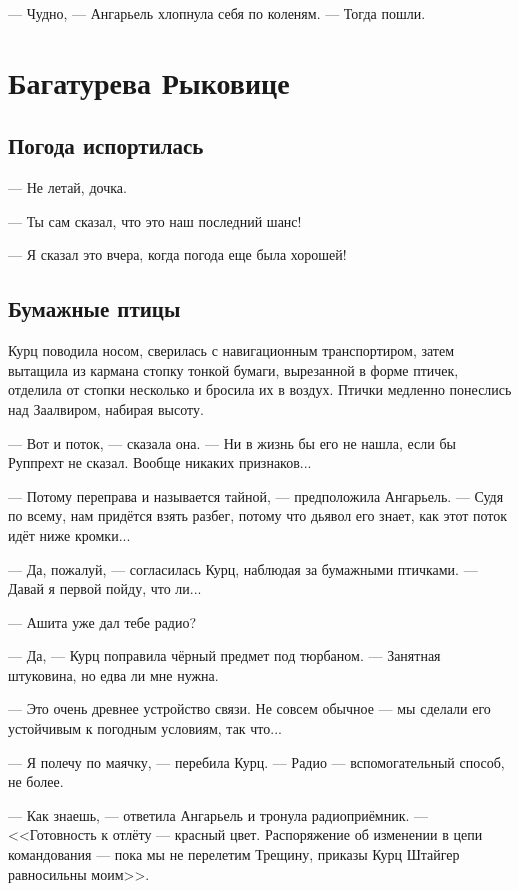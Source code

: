 --- Чудно, --- Ангарьель хлопнула себя по коленям.
--- Тогда пошли.

\chapter{Багатурева Рыковице}


\section{Погода испортилась}

--- Не летай, дочка.

--- Ты сам сказал, что это наш последний шанс!

--- Я сказал это вчера, когда погода еще была хорошей!

\section{Бумажные птицы}

Курц поводила носом, сверилась с навигационным транспортиром, затем вытащила из кармана стопку тонкой бумаги, вырезанной в форме птичек, отделила от стопки несколько и бросила их в воздух.
Птички медленно понеслись над Заалвиром, набирая высоту.

--- Вот и поток, --- сказала она.
--- Ни в жизнь бы его не нашла, если бы Руппрехт не сказал.
Вообще никаких признаков...

--- Потому переправа и называется тайной, --- предположила Ангарьель.
--- Судя по всему, нам придётся взять разбег, потому что дьявол его знает, как этот поток идёт ниже кромки...

--- Да, пожалуй, --- согласилась Курц, наблюдая за бумажными птичками.
--- Давай я первой пойду, что ли...

--- Ашита уже дал тебе радио?

--- Да, --- Курц поправила чёрный предмет под тюрбаном.
--- Занятная штуковина, но едва ли мне нужна.

--- Это очень древнее устройство связи.
Не совсем обычное --- мы сделали его устойчивым к погодным условиям, так что...

--- Я полечу по маячку, --- перебила Курц.
--- Радио --- вспомогательный способ, не более.

--- Как знаешь, --- ответила Ангарьель и тронула радиоприёмник.
--- <<Готовность к отлёту --- красный цвет.
Распоряжение об изменении в цепи командования --- пока мы не перелетим Трещину, приказы Курц Штайгер равносильны моим>>.

